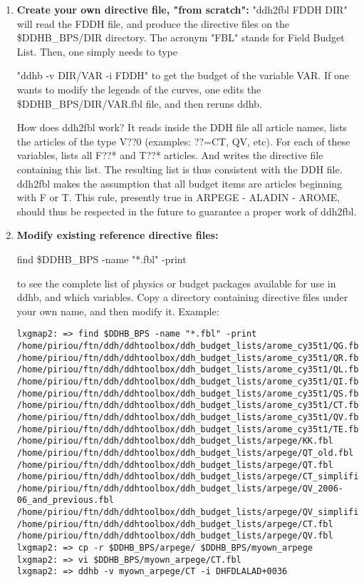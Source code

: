 \begin{enumerate}
  \item {\bf Create your own directive file, "from scratch":} "ddh2fbl FDDH DIR" will read the FDDH file, and
    produce the directive files on the \$DDHB\_BPS/DIR directory. The acronym "FBL" stands for Field Budget List.
    Then, one simply needs to type 

    \p "ddhb -v DIR/VAR -i FDDH" to get the budget of the variable VAR. If one
    wants to modify the legends of the curves, one edits the  \$DDHB\_BPS/DIR/VAR.fbl
    file, and then reruns ddhb.

    \p How does ddh2fbl work? It reads inside the DDH file all article names, lists
    the articles of the type V??0 (examples: ??=CT, QV, etc). For each of these
    variables, lists all F??* and T??* articles. And writes the directive file
    containing this list. The resulting list is thus consistent with the DDH file.
    ddh2fbl makes the assumption that all budget items are articles beginning with
    F or T. This rule, presently true in ARPEGE - ALADIN - AROME, should thus be respected
    in the future to guarantee a proper work of ddh2fbl.
  \item {\bf Modify existing reference directive files:}

    \p find \$DDHB\_BPS -name "*.fbl" -print

    \p to see the complete list of physics or budget packages
    available for use in ddhb, and which variables.
    Copy a directory containing directive files under your own name, and then modify it.
    Example:
    {\tiny \begin{verbatim}
lxgmap2: => find $DDHB_BPS -name "*.fbl" -print
/home/piriou/ftn/ddh/ddhtoolbox/ddh_budget_lists/arome_cy35t1/QG.fbl
/home/piriou/ftn/ddh/ddhtoolbox/ddh_budget_lists/arome_cy35t1/QR.fbl
/home/piriou/ftn/ddh/ddhtoolbox/ddh_budget_lists/arome_cy35t1/QL.fbl
/home/piriou/ftn/ddh/ddhtoolbox/ddh_budget_lists/arome_cy35t1/QI.fbl
/home/piriou/ftn/ddh/ddhtoolbox/ddh_budget_lists/arome_cy35t1/QS.fbl
/home/piriou/ftn/ddh/ddhtoolbox/ddh_budget_lists/arome_cy35t1/CT.fbl
/home/piriou/ftn/ddh/ddhtoolbox/ddh_budget_lists/arome_cy35t1/QV.fbl
/home/piriou/ftn/ddh/ddhtoolbox/ddh_budget_lists/arome_cy35t1/TE.fbl
/home/piriou/ftn/ddh/ddhtoolbox/ddh_budget_lists/arpege/KK.fbl
/home/piriou/ftn/ddh/ddhtoolbox/ddh_budget_lists/arpege/QT_old.fbl
/home/piriou/ftn/ddh/ddhtoolbox/ddh_budget_lists/arpege/QT.fbl
/home/piriou/ftn/ddh/ddhtoolbox/ddh_budget_lists/arpege/CT_simplified.fbl
/home/piriou/ftn/ddh/ddhtoolbox/ddh_budget_lists/arpege/QV_2006-06_and_previous.fbl
/home/piriou/ftn/ddh/ddhtoolbox/ddh_budget_lists/arpege/QV_simplified.fbl
/home/piriou/ftn/ddh/ddhtoolbox/ddh_budget_lists/arpege/CT.fbl
/home/piriou/ftn/ddh/ddhtoolbox/ddh_budget_lists/arpege/QV.fbl
lxgmap2: => cp -r $DDHB_BPS/arpege/ $DDHB_BPS/myown_arpege
lxgmap2: => vi $DDHB_BPS/myown_arpege/CT.fbl
lxgmap2: => ddhb -v myown_arpege/CT -i DHFDLALAD+0036
    \end{verbatim}}
\end{enumerate}

